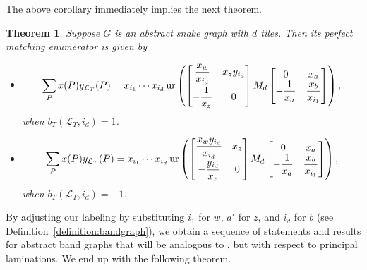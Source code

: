 \documentclass[10pt,a4paper]{amsart}
\numberwithin{equation}{section}
\newtheorem{Theorem}{Theorem}[section]
\theoremstyle{definition}
\begin{document}
The above corollary immediately implies the next theorem.

\begin{Theorem}\label{theorem:perfectmatchingenum}
 Suppose $G$ is an abstract snake graph with $d$ tiles. Then its perfect matching enumerator is given by
 \begin{itemize}\itemsep=0pt
 \item \[
 \sum_P x(P)y_{\mathcal{L}_T}(P)=x_{i_1}\cdots x_{i_d} \operatorname{ur}\left(\begin{bmatrix}
\dfrac{x_w}{x_{i_d}} & x_{z}y_{i_d}\vspace{1mm}\\
-\dfrac{1}{x_{z}} & 0
\end{bmatrix}
M_d
\begin{bmatrix}
0 & x_a\\
-\dfrac{1}{x_a} & \dfrac{x_b}{x_{i_1}}
\end{bmatrix}\right),\] when $ b_{T}(\mathcal{L}_{T}, i_{d})=1$.

\item \[
\sum_P x(P)y_{\mathcal{L}_T}(P)=x_{i_1}\cdots x_{i_d} \operatorname{ur}\left(\begin{bmatrix}
\dfrac{x_w y_{i_d}}{x_{i_d}} & x_{z}\vspace{1mm}\\
-\dfrac{y_{i_d}}{x_{z}} & 0
\end{bmatrix}
M_d
\begin{bmatrix}
0 & x_a\\
-\dfrac{1}{x_a} & \dfrac{x_b}{x_{i_1}}
\end{bmatrix}\right),\] when $b_{T}(\mathcal{L}_{T}, i_{d})=-1$.
\end{itemize}
\end{Theorem}

By adjusting our labeling by substituting $i_1$ for $w$, $a'$ for $z$, and $i_d$ for $b$ (see Definition~\ref{definition:bandgraph}), we obtain a sequence of statements and results for abstract band graphs that will be analogous to \cite[Proposition 5.7 and Corollary 5.8]{MW13}, but with respect to principal laminations. We end up with the following theorem.
\end{document}
